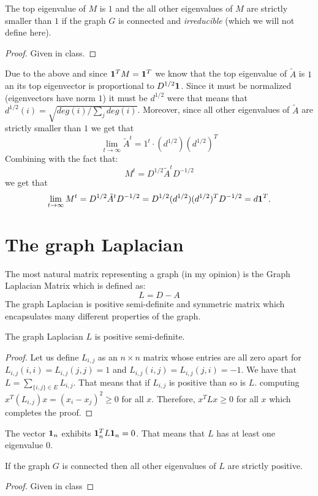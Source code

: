 \documentclass{article}
\begin{document}
\begin{fact}\label{asdfg}
The top eigenvalue of $M$ is $1$ and the all other eigenvalues of $M$ are strictly smaller than $1$ if the graph $G$ is 
connected and {\it irreducible} (which we will not define here).  
\end{fact}
\begin{proof}
Given in class.
\end{proof}

Due to the above and since $\mathbf{1}^TM = \mathbf{1}^T$ we know that the top eigenvalue of $\tilde{A}$ is $1$ an its top eigenvector is proportional to $D^{1/2}\mathbf{1}$. Since it must be normalized (eigenvectors have norm $1$) it must be $d^{1/2}$ were that means that $d^{1/2}(i) = \sqrt{deg(i)/\sum_{j}deg(i)}$.
Moreover, since all other eigenvalues of $\tilde{A}$ are strictly smaller than $1$ we get that 
\[
\lim_{t \rightarrow \infty} \tilde{A}^t = 1^t \cdot (d^{1/2})(d^{1/2})^T
\]
Combining with the fact that:
\[
M^t = D^{1/2}\tilde{A}^t D^{-1/2}
\]
we get that 
\[
\lim_{t \rightarrow \infty} M^t = D^{1/2}\tilde{A}^t D^{-1/2} =  D^{1/2} (d^{1/2})(d^{1/2})^T D^{-1/2} = d \mathbf{1}^T.
\]

\section{The graph Laplacian}

The most natural matrix representing a graph (in my opinion) is the Graph Laplacian Matrix which is defined as:
\[
L = D - A
\]
The graph Laplacian is positive semi-definite and symmetric matrix which encapsulates many different properties of the graph.
\begin{fact}
The graph Laplacian $L$ is positive semi-definite.
\end{fact}
\begin{proof}
Let us define $L_{i,j}$ as an $n \times n$ matrix whose entries are all zero apart for $L_{i,j}(i,i) = L_{i,j}(j,j) =1$ and  $L_{i,j}(i,j) = L_{i,j}(j,i) = -1$.
We have that $L = \sum_{\{i,j\} \in E} L_{i,j}$. That means that if $L_{i,j}$ is positive than so is $L$.
computing $x^T(L_{i,j})x  = (x_i - x_j)^2 \ge 0$ for all $x$. Therefore,  $x^T L x \ge 0$ for all $x$ which completes the proof.
\end{proof}

The vector $\mathbf{1}_n$ exhibits $\mathbf{1}_n^T L \mathbf{1}_n = 0$. 
That means that $L$ has at least one eigenvalue $0$. 

\begin{fact}
If the graph $G$ is connected then all other eigenvalues of $L$ are strictly positive.
\end{fact}
\begin{proof}
Given in class
\end{proof}
\end{document}
